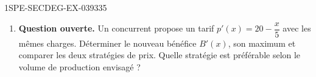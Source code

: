 \begin{exercice}{1SPE-SECDEG-EX-039}{3}{35}
\begin{enumerate}
  \item \textbf{Question ouverte.} Un concurrent propose un tarif $p'(x) = 20 - \dfrac{x}{5}$ avec les mêmes charges. Déterminer le nouveau bénéfice $B'(x)$, son maximum et comparer les deux stratégies de prix. Quelle stratégie est préférable selon le volume de production envisagé ?
\end{enumerate}
\end{exercice}
